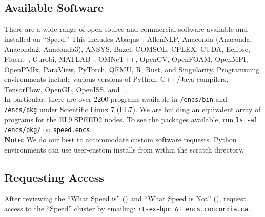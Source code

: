 \documentclass{easychair}
\begin{document}
\subsection{Available Software}
\label{sect:available-software}

There are a wide range of open-source and commercial software available and installed on ``Speed.'' 
This includes Abaqus~\cite{abaqus}, AllenNLP, Anaconda (Anaconda, Anaconda2, Anaconda3), ANSYS, Bazel,
COMSOL, CPLEX, CUDA, Eclipse, Fluent~\cite{fluent}, Gurobi, MATLAB~\cite{matlab,scholarpedia-matlab}, 
OMNeT++, OpenCV, OpenFOAM, OpenMPI, OpenPMIx, ParaView, PyTorch, QEMU, R, Rust, and Singularity.
Programming environments include various versions of Python, C++/Java compilers, TensorFlow, OpenGL, OpenISS, and {\marf}~\cite{marf}.\\

In particular, there are over 2200 programs available in \texttt{/encs/bin} and \texttt{/encs/pkg} under Scientific Linux 7 (EL7).
We are building an equivalent array of programs for the EL9 SPEED2 nodes. To see the packages available, run \texttt{ls -al /encs/pkg/} on \texttt{speed.encs}.\\

\noindent
\textbf{Note:} We do our best to accommodate custom software requests. Python environments can use user-custom installs 
from within the scratch directory.

\subsection{Requesting Access}
\label{sect:access-requests}

After reviewing the ``What Speed is'' () and
``What Speed is Not'' (), request access to the ``Speed'' 
cluster by emailing: \texttt{rt-ex-hpc AT encs.concordia.ca}.
\end{document}
